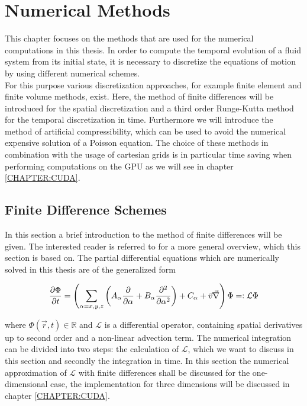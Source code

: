 \chapter{Numerical Methods}

This chapter focuses on the methods that are used for the numerical computations in this thesis.
In order to compute the temporal evolution of a fluid system from its initial state, it is necessary to discretize
the equations of motion by using different numerical schemes.\\
For this purpose various discretization approaches, for example finite element and finite volume methods, exist.
Here, the method of finite differences will be introduced for the spatial discretization and a third order Runge-Kutta method for the temporal discretization in time.
Furthermore we will introduce the method of artificial compressibility, which can be used to avoid the numerical expensive solution of a Poisson equation.
The choice of these methods in combination with the usage of cartesian grids is in particular time saving when performing computations on the GPU as we
will see in chapter \ref{CHAPTER:CUDA}.

\section{Finite Difference Schemes}

In this section a  brief introduction to the method of finite differences will be given.
The interested reader is referred to \citep{ferziger99} for a more general overview, which this section is based on.
The partial differential equations which are numerically solved in this thesis are of the generalized form

\begin{align}
    \label{numerik:pde_allg}
    \pdn[\Phi]{t} = \left(\sum_{\alpha=x,y,z}\left( A_\alpha \pdn[]{\alpha}  + B_\alpha \pdn[^2]{\alpha^2}\right) + C_\alpha +  \vec{v}\vec{\nabla} \right) \Phi =: \mathcal{L} \Phi
\end{align}

where $\Phi(\vec{r}, t)\in\mathbb{R}$ and $\mathcal{L}$ is a differential operator, containing spatial derivatives up to second order and a non-linear advection term.
The numerical integration can be divided into two steps: the calculation of $\mathcal{L}$, which we want to discuss in this
section and secondly the integration in time.
In this section the numerical approximation of $\mathcal{L}$ with finite differences shall be discussed for the one-dimensional case,
the implementation for three dimensions will be discussed in chapter \ref{CHAPTER:CUDA}.


